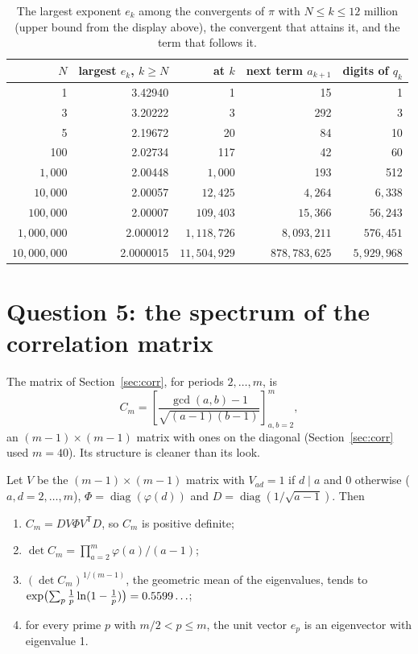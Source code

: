 \begin{table}[t]
\centering
\caption[The exponents of pi's convergents]{The largest exponent $e_k$ among the convergents of $\pi$ with $N \le k \le 12$ million (upper bound from the display above), the convergent that attains it, and the term that follows it.}
\label{tab:oq-exponent}
\begin{tabular}{rrrrr}
\toprule
$N$ & largest $e_k$, $k \ge N$ & at $k$ & next term $a_{k+1}$ & digits of $q_k$ \\
\midrule
1 & 3.42940 & 1 & 15 & 1 \\
3 & 3.20222 & 3 & 292 & 3 \\
5 & 2.19672 & 20 & 84 & 10 \\
100 & 2.02734 & 117 & 42 & 60 \\
$1{,}000$ & 2.00448 & $1{,}000$ & 193 & 512 \\
$10{,}000$ & 2.00057 & $12{,}425$ & $4{,}264$ & $6{,}338$ \\
$100{,}000$ & 2.00007 & $109{,}403$ & $15{,}366$ & $56{,}243$ \\
$1{,}000{,}000$ & 2.000012 & $1{,}118{,}726$ & $8{,}093{,}211$ & $576{,}451$ \\
$10{,}000{,}000$ & 2.0000015 & $11{,}504{,}929$ & $878{,}783{,}625$ & $5{,}929{,}968$ \\
\bottomrule
\end{tabular}
\end{table}

\section{Question 5: the spectrum of the correlation matrix}\label{sec:oq5}

The matrix of Section~\ref{sec:corr}, for periods $2, \dots, m$, is
\[
  C_m = \left[\frac{\gcd(a,b) - 1}{\sqrt{(a-1)(b-1)}}\right]_{a, b = 2}^{m},
\]
an $(m-1) \times (m-1)$ matrix with ones on the diagonal (Section~\ref{sec:corr} used $m = 40$). Its structure is cleaner than its look.

\begin{proposition}[structure]\label{prop:oq-gram}
Let $V$ be the $(m-1)\times(m-1)$ matrix with $V_{ad} = 1$ if $d \mid a$ and $0$ otherwise ($a, d = 2, \dots, m$), $\Phi = \operatorname{diag}(\varphi(d))$ and $D = \operatorname{diag}(1/\sqrt{a-1})$. Then
\begin{enumerate}[label=(\roman*)]
\item $C_m = D V \Phi V^{\mathsf T} D$, so $C_m$ is positive definite;
\item $\det C_m = \prod_{a=2}^{m}\varphi(a)/(a-1)$;
\item $(\det C_m)^{1/(m-1)}$, the geometric mean of the eigenvalues, tends to $\exp\bigl(\sum_p \frac1p\ln(1 - \frac1p)\bigr) = 0.5599\ldots$;
\item for every prime $p$ with $m/2 < p \le m$, the unit vector $e_p$ is an eigenvector with eigenvalue 1.
\end{enumerate}
\end{proposition}

